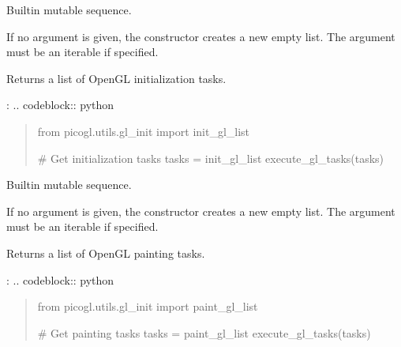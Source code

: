 \documentclass[a4paper,10pt,english,openany,oneside]{sphinxmanual}
\begin{document}
\begin{fulllineitems}
\label{\detokenize{api/utils:picogl.utils.gl_init.init_gl_list}}
\pysigstartsignatures
\pysiglinewithargsret
{}
{}
{}
\pysigstopsignatures
\sphinxAtStartPar
Built\sphinxhyphen{}in mutable sequence.

\sphinxAtStartPar
If no argument is given, the constructor creates a new empty list.
The argument must be an iterable if specified.

\end{fulllineitems}


\sphinxAtStartPar
Returns a list of OpenGL initialization tasks.

\sphinxAtStartPar
{}:
.. code\sphinxhyphen{}block:: python
\begin{quote}

\sphinxAtStartPar
from picogl.utils.gl\_init import init\_gl\_list

\sphinxAtStartPar
\# Get initialization tasks
tasks = init\_gl\_list
execute\_gl\_tasks(tasks)
\end{quote}

\begin{fulllineitems}
\label{\detokenize{api/utils:picogl.utils.gl_init.paint_gl_list}}
\pysigstartsignatures
\pysiglinewithargsret
{}
{}
{}
\pysigstopsignatures
\sphinxAtStartPar
Built\sphinxhyphen{}in mutable sequence.

\sphinxAtStartPar
If no argument is given, the constructor creates a new empty list.
The argument must be an iterable if specified.

\end{fulllineitems}


\sphinxAtStartPar
Returns a list of OpenGL painting tasks.

\sphinxAtStartPar
{}:
.. code\sphinxhyphen{}block:: python
\begin{quote}

\sphinxAtStartPar
from picogl.utils.gl\_init import paint\_gl\_list

\sphinxAtStartPar
\# Get painting tasks
tasks = paint\_gl\_list
execute\_gl\_tasks(tasks)
\end{quote}
\end{document}
